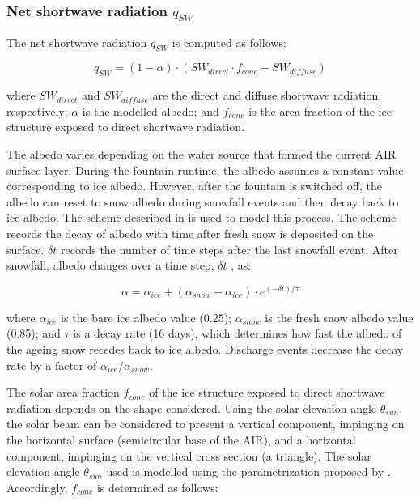\subsubsection{Net shortwave radiation \texorpdfstring{$q_{SW}$}{Lg}}

The net shortwave radiation $q_{SW}$ is computed as follows:

\begin{equation} q_{SW} = (1- \alpha)\cdot (SW_{direct} \cdot f_{cone} + SW_{diffuse}) \label{eqn:SW} \end{equation}

where $SW_{direct}$ and $SW_{diffuse}$ are the direct and diffuse shortwave radiation, respectively; $\alpha$ is the
modelled albedo; and $f_{cone}$ is the area fraction of the ice structure exposed to direct shortwave
radiation.

The albedo varies depending on the water source that formed the current \ac{AIR} surface layer. During the fountain
runtime, the albedo assumes a constant value corresponding to ice albedo. However, after the fountain is
switched off, the albedo can reset to snow albedo during snowfall events and then decay back to ice albedo. The scheme described in \cite{oerlemansYearRecordGlobal1998} is used to model this process. The scheme records the
decay of albedo with time after fresh snow is deposited on the surface. $\delta t$ records the number of time
steps after the last snowfall event. After snowfall, albedo changes over a time step, $\delta t$ , as:

\begin{equation} \alpha=\alpha_{ice}+(\alpha_{snow}-\alpha_{ice}) \cdot e^{(-\delta t)/\tau} \label{eqn:alb}
\end{equation}

where $\alpha_{ice}$ is the bare ice albedo value (0.25); $\alpha_{snow}$ is the fresh snow albedo value (0.85);
and $\tau$ is a decay rate (16 days), which determines how fast the albedo of the ageing snow recedes back to
ice albedo. Discharge events decrease the decay rate by a factor of $\alpha_{ice}/\alpha_{snow}$.

The solar area fraction $f_{cone}$ of the ice structure exposed to direct shortwave radiation depends on the shape
considered. Using the solar elevation angle $\theta_{sun}$, the solar beam can be considered to present a vertical
component, impinging on the horizontal surface (semicircular base of the \ac{AIR}), and a horizontal component,
impinging on the vertical cross section (a triangle). The solar elevation angle $\theta_{sun}$ used is modelled
using the parametrization proposed by \cite{woolfComputationSolarElevation1968}. Accordingly, $f_{cone}$ is determined as follows:

